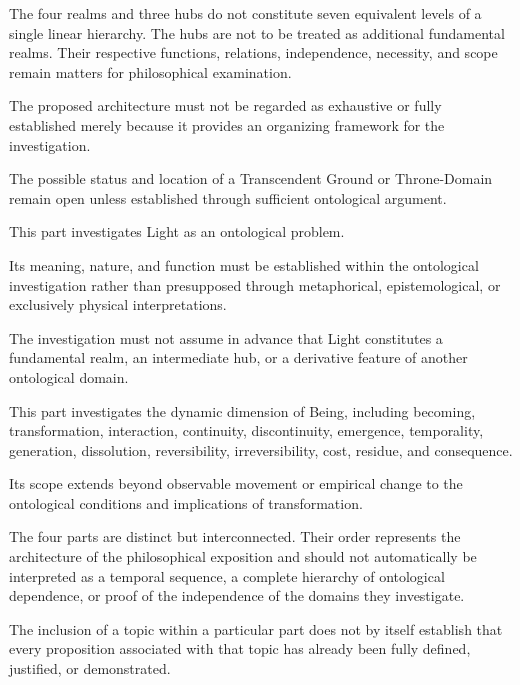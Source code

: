 \begin{description}
    The four realms and three hubs do not constitute
    seven equivalent levels of a single linear
    hierarchy. The hubs are not to be treated
    as additional fundamental realms. Their
    respective functions, relations, independence,
    necessity, and scope remain matters for
    philosophical examination.

    The proposed architecture must not be regarded
    as exhaustive or fully established merely
    because it provides an organizing framework
    for the investigation.

    The possible status and location of a
    Transcendent Ground or Throne-Domain remain
    open unless established through sufficient
    ontological argument.

    \item[Part III: Light]
    This part investigates Light as an ontological
    problem.

    Its meaning, nature, and function must be
    established within the ontological investigation
    rather than presupposed through metaphorical,
    epistemological, or exclusively physical
    interpretations.

    The investigation must not assume in advance
    that Light constitutes a fundamental realm,
    an intermediate hub, or a derivative feature
    of another ontological domain.

    \item[Part IV: Dynamics of Being]
    This part investigates the dynamic dimension
    of Being, including becoming, transformation,
    interaction, continuity, discontinuity,
    emergence, temporality, generation, dissolution,
    reversibility, irreversibility, cost, residue,
    and consequence.

    Its scope extends beyond observable movement
    or empirical change to the ontological conditions
    and implications of transformation.

\end{description}

The four parts are distinct but interconnected.
Their order represents the architecture of the
philosophical exposition and should not automatically
be interpreted as a temporal sequence, a complete
hierarchy of ontological dependence, or proof
of the independence of the domains they investigate.

The inclusion of a topic within a particular part
does not by itself establish that every proposition
associated with that topic has already been fully
defined, justified, or demonstrated.

